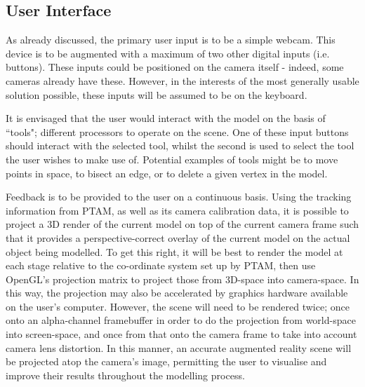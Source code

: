 \documentclass[a4paper,10pt]{article}
\begin{document}
\subsection{User Interface}
As already discussed, the primary user input is to be a simple webcam. This device is to be augmented with a maximum of two other digital inputs (i.e. buttons). These inputs could be positioned on the camera itself - indeed, some cameras already have these. However, in the interests of the most generally usable solution possible, these inputs will be assumed to be on the keyboard.

It is envisaged that the user would interact with the model on the basis of ``tools"; different processors to operate on the scene. One of these input buttons should interact with the selected tool, whilst the second is used to select the tool the user wishes to make use of. Potential examples of tools might be to move points in space, to bisect an edge, or to delete a given vertex in the model.

Feedback is to be provided to the user on a continuous basis. Using the tracking information from PTAM, as well as its camera calibration data, it is possible to project a 3D render of the current model on top of the current camera frame such that it provides a perspective-correct overlay of the current model on the actual object being modelled. To get this right, it will be best to render the model at each stage relative to the co-ordinate system set up by PTAM, then use OpenGL's projection matrix to project those from 3D-space into camera-space. In this way, the projection may also be accelerated by graphics hardware available on the user's computer. However, the scene will need to be rendered twice; once onto an alpha-channel framebuffer in order to do the projection from world-space into screen-space, and once from that onto the camera frame to take into account camera lens distortion. In this manner, an accurate augmented reality scene will be projected atop the camera's image, permitting the user to visualise and improve their results throughout the modelling process.
\end{document}
